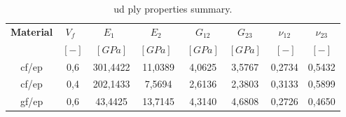 \begin{table}[htbp]
  \centering
  \caption{\acrshort{ud} ply properties summary.}
    \begin{tabular}{cccccccc}
    \toprule
  \textbf{Material} & \textbf{$V_{f}$}\ & \textbf{$E_{1}$}\ & \textbf{$E_{2}$}\ & \textbf{$G_{12}$} &  \textbf{$G_{23}$} &\textbf{$\nu_{12}$} & \textbf{$\nu_{23}$} \\
   & \textbf{$\left[-\right]$} &\textbf{$\left[GPa\right]$}& \textbf{$\left[GPa\right]$}\ & \textbf{$\left[GPa\right]$}& \textbf{$\left[GPa\right]$} & \textbf{$\ \left[-\right]$} & \textbf{$\left[-\right]$} \\
    \midrule
    \acrshort{cf}/\acrshort{ep} & 0,6   & 301,4422 & 11,0389 & 4,0625 & 3,5767 & 0,2734 & 0,5432 \\
    \acrshort{cf}/\acrshort{ep} & 0,4   & 202,1433 & 7,5694 & 2,6136 & 2,3803 & 0,3133 & 0,5899 \\
    \acrshort{gf}/\acrshort{ep} & 0,6   & 43,4425 & 13,7145 & 4,3140 & 4,6808 & 0,2726 & 0,4650 \\
    \bottomrule
    \end{tabular}%
  \label{tab:UDprop}%
\end{table}%
